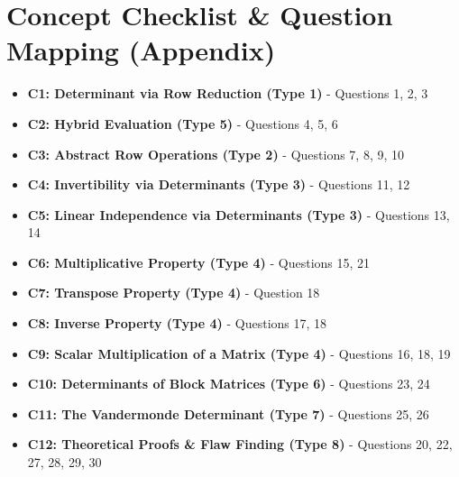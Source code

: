 \documentclass[11pt]{article}
\begin{document}
\section{Concept Checklist \& Question Mapping (Appendix)}
\begin{itemize}
    \item \textbf{C1: Determinant via Row Reduction (Type 1)} - Questions 1, 2, 3
    \item \textbf{C2: Hybrid Evaluation (Type 5)} - Questions 4, 5, 6
    \item \textbf{C3: Abstract Row Operations (Type 2)} - Questions 7, 8, 9, 10
    \item \textbf{C4: Invertibility via Determinants (Type 3)} - Questions 11, 12
    \item \textbf{C5: Linear Independence via Determinants (Type 3)} - Questions 13, 14
    \item \textbf{C6: Multiplicative Property (Type 4)} - Questions 15, 21
    \item \textbf{C7: Transpose Property (Type 4)} - Question 18
    \item \textbf{C8: Inverse Property (Type 4)} - Questions 17, 18
    \item \textbf{C9: Scalar Multiplication of a Matrix (Type 4)} - Questions 16, 18, 19
    \item \textbf{C10: Determinants of Block Matrices (Type 6)} - Questions 23, 24
    \item \textbf{C11: The Vandermonde Determinant (Type 7)} - Questions 25, 26
    \item \textbf{C12: Theoretical Proofs \& Flaw Finding (Type 8)} - Questions 20, 22, 27, 28, 29, 30
\end{itemize}
\end{document}
